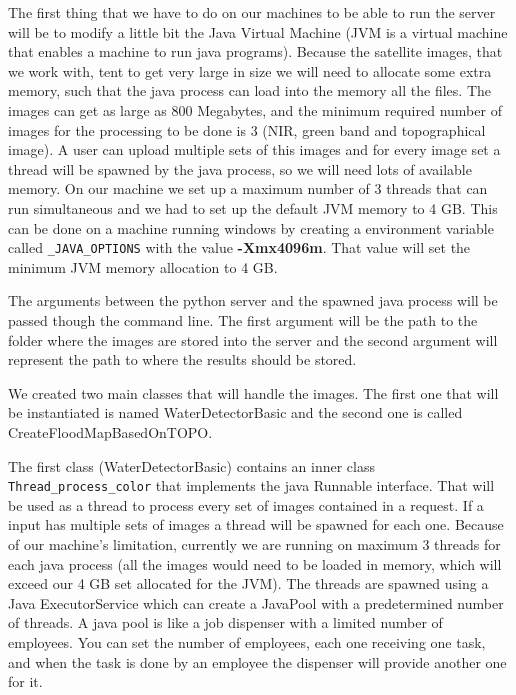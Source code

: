 \documentclass[12pt, a4paper]{report}
\begin{document}
\quad 
The first thing that we have to do on our machines to be able to run the server will be to modify a little bit the Java Virtual Machine (JVM is a virtual machine that enables a machine to run java programs). Because the satellite images, that we work with, tent to get very large in size we will need to allocate some extra memory, such that the java process can load into the memory all the files. The images can get as large as 800 Megabytes, and the minimum required number of images for the processing to be done is 3 (NIR, green band and topographical image). A user can upload multiple sets of this images and for every image set a thread will be spawned by the java process, so we will need lots of available memory. On our machine we set up a maximum number of 3 threads that can run simultaneous and we had to set up the default JVM memory to 4 GB. This can be done on a machine running windows by  creating a environment variable called \texttt{\_JAVA\_OPTIONS} with the value \textbf{-Xmx4096m}. That value will set the minimum JVM memory allocation to 4 GB.
\par 

The arguments between the python server and the spawned java process will be passed though the command line. The first argument will be the path to the folder where the images are stored into the server and the second argument will represent the path to where the results should be stored.
\par 

We created two main classes that will handle the images. The first one that will be instantiated is named WaterDetectorBasic and the second one is called CreateFloodMapBasedOnTOPO.
\par 

The first class (WaterDetectorBasic) contains an inner class \texttt{Thread\_process\_color} that implements the java Runnable interface. That will be used as a thread to process every set of images contained in a request. If a input has multiple sets of images a thread will be spawned for each one. Because of our machine's limitation, currently we are running on maximum 3 threads for each java process (all the images would need to be loaded in memory, which will exceed our 4 GB set allocated for the JVM). The threads are spawned using a Java ExecutorService which can create a JavaPool with a predetermined number of threads. A java pool is like a job dispenser with a limited number of employees. You can set the number of employees, each one receiving one task, and when the task is done by an employee the dispenser will provide another one for it.
\end{document}
